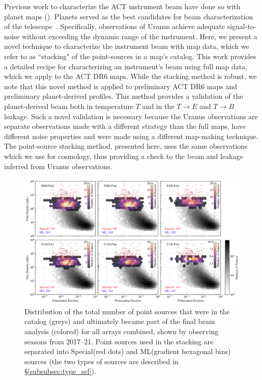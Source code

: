 Previous work to characterize the ACT instrument beam have done so with planet maps (\cite{hasselfield_atacama_2013,louis_2017,naess_2014}).  Planets served as the best candidates for beam characterization of the telescope~\cite{Lungu_2022}.  Specifically, observations of Uranus achieve adequate signal-to-noise without exceeding the dynamic range of the instrument.  Here, we present a novel technique to characterize the instrument beam with map data, which we refer to as ``stacking" of the point-sources in a map's catalog.  This work provides a detailed recipe for characterizing an instrument's beam using full map data, which we apply to the ACT DR6 maps.  While the stacking method is robust, we note that this novel method is applied to preliminary ACT DR6 maps and preliminary planet-derived profiles.  This method provides a validation of the planet-derived beam both in temperature $T$ and in the $T\rightarrow E$ and $T\rightarrow B$ leakage.  Such a novel validation is necessary because the Uranus observations are separate observations made with a different strategy than the full maps, have different noise properties and were made using a different map-making technique.  The point-source stacking method, presented here, uses the same observations which we use for cosmology, thus providing a check to the beam and leakage inferred from Uranus observations.

\begin{figure}[t]
\vspace{1em}
    \centering
    \includegraphics[width=\linewidth]{Figures/pt_src_dist.png}
    \caption{Distribution of the total number of point sources that were in the catalog (greys) and ultimately became part of the final beam analysis (colored) for all arrays combined, shown by observing seasons from 2017--21.  Point sources used in the stacking are separated into Special(red dots) and ML(gradient hexagonal bins) sources (the two types of sources are described in \S\ref{subsubsec:type_sel}).
    }
    \label{fig:ptsrc_select}
    \vspace{1em}
\end{figure}

